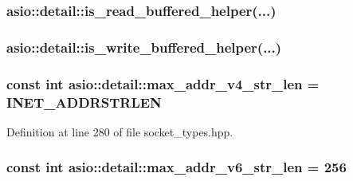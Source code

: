 \subsubsection[{is\+\_\+read\+\_\+buffered\+\_\+helper}]{ asio\+::detail\+::is\+\_\+read\+\_\+buffered\+\_\+helper(...)}\label{namespaceasio_1_1detail_ac51ba8a0b2cbbab69d47430bb1f61b14}
\hypertarget{namespaceasio_1_1detail_a92c09d4f26720d51674e29602933009c}{}
\subsubsection[{is\+\_\+write\+\_\+buffered\+\_\+helper}]{ asio\+::detail\+::is\+\_\+write\+\_\+buffered\+\_\+helper(...)}\label{namespaceasio_1_1detail_a92c09d4f26720d51674e29602933009c}
\hypertarget{namespaceasio_1_1detail_a286f3216bbf2141a8cf666a7506ee6f0}{}
\subsubsection[{max\+\_\+addr\+\_\+v4\+\_\+str\+\_\+len}]{\setlength{\rightskip}{0pt plus 5cm}const int asio\+::detail\+::max\+\_\+addr\+\_\+v4\+\_\+str\+\_\+len = I\+N\+E\+T\+\_\+\+A\+D\+D\+R\+S\+T\+R\+L\+E\+N}\label{namespaceasio_1_1detail_a286f3216bbf2141a8cf666a7506ee6f0}


Definition at line 280 of file socket\+\_\+types.\+hpp.

\hypertarget{namespaceasio_1_1detail_aa1c15a2c48591aee5952bc2f2124424d}{}
\subsubsection[{max\+\_\+addr\+\_\+v6\+\_\+str\+\_\+len}]{\setlength{\rightskip}{0pt plus 5cm}const int asio\+::detail\+::max\+\_\+addr\+\_\+v6\+\_\+str\+\_\+len = 256}\label{namespaceasio_1_1detail_aa1c15a2c48591aee5952bc2f2124424d}


